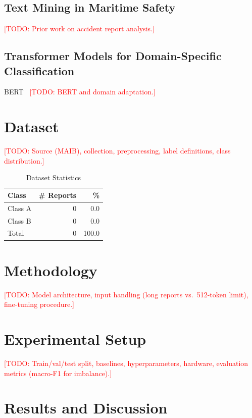 \documentclass[conference]{IEEEtran}
\newcommand{\todo}[1]{\textcolor{red}{[TODO: #1]}}
\begin{document}
\subsection{Text Mining in Maritime Safety}
\todo{Prior work on accident report analysis.}

\subsection{Transformer Models for Domain-Specific Classification}
BERT~\cite{devlin2019bert} \todo{BERT and domain adaptation.}

\section{Dataset}
\todo{Source (MAIB), collection, preprocessing, label definitions, class distribution.}

\begin{table}[htbp]
\caption{Dataset Statistics}
\label{tab:dataset}
\centering
\begin{tabular}{lrr}
\toprule
Class & \# Reports & \% \\
\midrule
Class A & 0 & 0.0 \\
Class B & 0 & 0.0 \\
\midrule
Total & 0 & 100.0 \\
\bottomrule
\end{tabular}
\end{table}

\section{Methodology}
\todo{Model architecture, input handling (long reports vs.\ 512-token limit), fine-tuning procedure.}

\section{Experimental Setup}
\todo{Train/val/test split, baselines, hyperparameters, hardware, evaluation metrics (macro-F1 for imbalance).}

\section{Results and Discussion}
\end{document}
